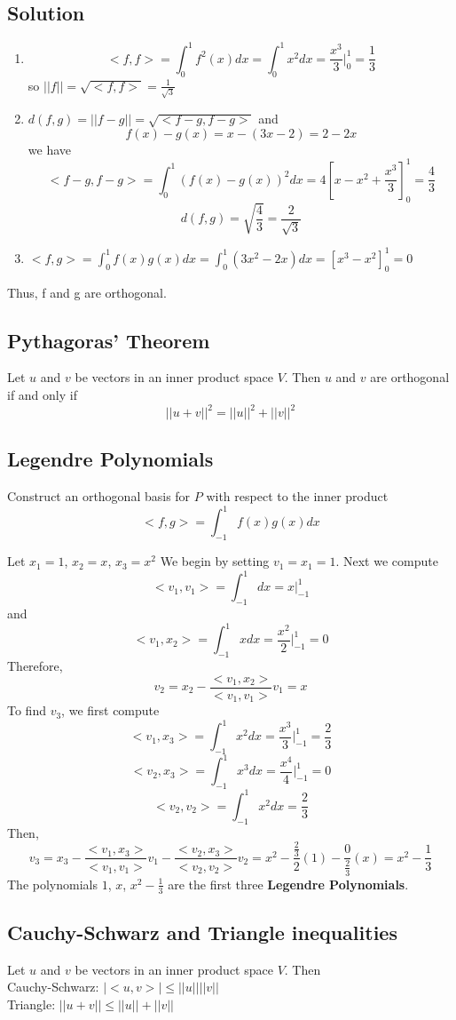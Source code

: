 \subsection*{Solution}
\begin{enumerate}
    \item $$<f,f> = \int_{0}^{1} f^2(x) dx = \int_{0}^{1} x^2 dx = \frac{x^3}{3}\Big|^1_0 = \frac{1}{3}$$ so $||f|| = \sqrt{<f,f>} = \frac{1}{\sqrt{3}}$
    \item $d(f,g) = ||f-g|| = \sqrt{<f-g, f-g>}$ and $$f(x) - g(x) = x - (3x-2) = 2-2x$$ we have $$<f-g,f-g> = \int_{0}^{1}(f(x)-g(x))^2 dx = 4[x - x^2 + \frac{x^3}{3}]^1_0 = \frac{4}{3}$$ $$d(f,g) = \sqrt{\frac{4}{3}} = \frac{2}{\sqrt{3}}$$
    \item $<f,g> = \int_{0}^{1}f(x)g(x) dx = \int_{0}^{1} (3x^2 - 2x) dx = [x^3-x^2]^1_0 = 0$
\end{enumerate}
Thus, f and g are orthogonal.
\subsection{Pythagoras' Theorem}
Let $u$ and $v$ be vectors in an inner product space $V$. Then $u$ and $v$ are orthogonal if and only if
$$||u+v||^2 = ||u||^2 + ||v||^2$$

\subsection{Legendre Polynomials}
Construct an orthogonal basis for $P$ with respect to the inner product
$$<f,g>= \int_{-1}^{1} f(x)g(x)dx$$

Let $x_1 = 1$, $x_2 = x$, $x_3 = x^2$ 
We begin by setting $v_1 = x_1 = 1$. Next we compute
$$<v_1, v_1>  = \int_{-1}^{1} dx = x \Big|_{-1}^{1}$$ and $$<v_1, x_2> = \int_{-1}^{1} x dx = \frac{x^2}{2} \Big|_{-1}^{1} = 0$$
Therefore, 
$$v_2 = x_2 - \frac{<v_1, x_2>}{<v_1, v_1>}v_1 = x$$
To find $v_3$, we first compute
$$<v_1, x_3> = \int_{-1}^{1} x^2 dx = \frac{x^3}{3} \Big|_{-1}^{1} = \frac{2}{3}$$
$$<v_2, x_3> = \int_{-1}^{1} x^3 dx = \frac{x^4}{4} \Big|_{-1}^{1} = 0$$
$$<v_2, v_2> = \int_{-1}^{1} x^2 dx = \frac{2}{3}$$
Then,
$$v_3 = x_3 - \frac{<v_1, x_3>}{<v_1, v_1>}v_1 - \frac{<v_2, x_3>}{<v_2, v_2>}v_2 = x^2 - \frac{\frac{2}{3}}{2}(1) - \frac{0}{\frac{2}{3}}(x) = x^2 - \frac{1}{3}$$
The polynomials $1$, $x$, $x^2 - \frac{1}{3}$ are the first three \textbf{Legendre Polynomials}.
\subsection{Cauchy-Schwarz and Triangle inequalities}
Let $u$ and $v$ be vectors in an inner product space $V$. Then\\
Cauchy-Schwarz: $|<u,v>| \leq ||u|| ||v||$\\
Triangle: $||u+v|| \leq ||u|| + ||v||$

